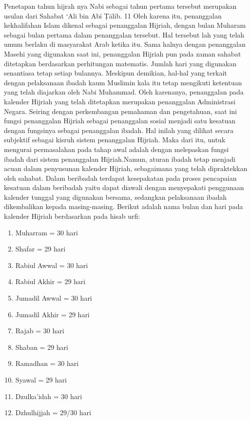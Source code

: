     Penetapan tahun hijrah nya Nabi sebagai tahun pertama tersebut merupakan usulan dari Sahabat ‘Ali bin Abī Ṭālib. 11 Oleh karena itu, penanggalan kekhalifahan Islam dikenal sebagai penanggalan Hijriah, dengan bulan Muharam sebagai bulan pertama dalam penanggalan tersebut. Hal tersebut lah yang telah umum berlaku di masyarakat Arab ketika itu.
    Sama halnya dengan penanggalan Masehi yang digunakan saat ini, penanggalan Hijriah pun pada zaman sahabat ditetapkan berdasarkan perhitungan matematis. Jumlah hari yang digunakan senantiasa tetap setiap bulannya. Meskipun demikian, hal-hal yang terkait dengan pelaksanaan ibadah kaum Muslimin kala itu tetap mengikuti ketentuan yang telah diajarkan oleh Nabi Muhammad.
    Oleh karenanya, penanggalan pada kalender Hijriah yang telah ditetapkan merupakan penanggalan Administrasi Negara. Seiring dengan perkembangan pemahaman dan pengetahuan, saat ini fungsi penanggalan Hijriah sebagai penanggalan sosial menjadi satu kesatuan dengan fungsinya sebagai penanggalan ibadah. Hal inilah yang dilihat secara subjektif sebagai kisruh sistem penanggalan Hijriah.
    Maka dari itu, untuk mengurai permasalahan pada tahap awal adalah dengan melepaskan fungsi ibadah dari sistem penanggalan Hijriah.Namun, aturan ibadah tetap menjadi acuan dalam penyusunan kalender Hijriah, sebagaimana yang telah dipraktekkan oleh sahabat. Dalam beribadah terdapat kesepakatan pada proses pencapaian kesatuan dalam beribadah yaitu dapat diawali dengan menyepakati penggunaan kalender tunggal yang digunakan bersama, sedangkan pelaksanaan ibadah dikembalikan kepada masing-masing. Berikut adalah nama bulan dan hari pada kalender Hijriah berdasarkan pada hisab urfi:
    \begin{enumerate}
        \item Muharram      = 30 hari
        \item Shafar        = 29 hari
        \item Rabiul Awwal  = 30 hari
        \item Rabiul Akhir  = 29 hari
        \item Jumadil Awwal = 30 hari
        \item Jumadil Akhir = 29 hari
        \item Rajab         = 30 hari
        \item Shaban        = 29 hari
        \item Ramadhan      = 30 hari
        \item Syawal        = 29 hari
        \item Dzulka'idah   = 30 hari
        \item Dzhulhijjah   = 29/30 hari
    \end{enumerate}


